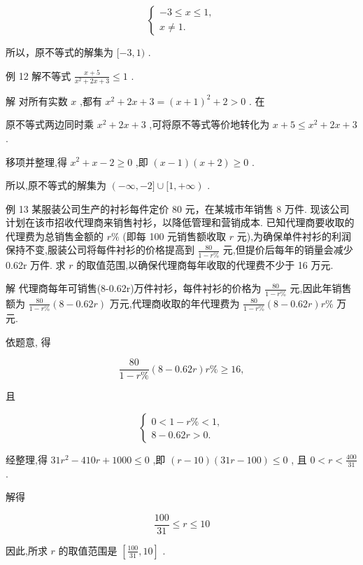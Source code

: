 \documentclass[10pt]{article}
\begin{document}
\[
\left\{  \begin{array}{l}  - 3 \leq  x \leq  1, \\  x \neq  1. \end{array}\right.
\]

所以，原不等式的解集为 \(\lbrack  - 3,1)\) .

例 12 解不等式 \(\frac{x + 5}{{x}^{2} + {2x} + 3} \leq  1\) .

解 对所有实数 \(x\) ,都有 \({x}^{2} + {2x} + 3 = {\left( x + 1\right) }^{2} + 2 > 0\) . 在

原不等式两边同时乘 \({x}^{2} + {2x} + 3\) ,可将原不等式等价地转化为 \(x + 5 \leq  {x}^{2} + {2x} + 3\) .

移项并整理,得 \({x}^{2} + x - 2 \geq  0\) ,即 \(\left( {x - 1}\right) \left( {x + 2}\right)  \geq  0\) .

所以,原不等式的解集为 \(\left( {-\infty , - 2\rbrack \cup \lbrack 1, + \infty }\right)\) .

例 13 某服装公司生产的衬衫每件定价 80 元，在某城市年销售 8 万件. 现该公司计划在该市招收代理商来销售衬衫，以降低管理和营销成本. 已知代理商要收取的代理费为总销售金额的 \(r\%\) (即每 100 元销售额收取 \(r\) 元),为确保单件衬衫的利润保持不变,服装公司将每件衬衫的价格提高到 \(\frac{80}{1 - r\% }\) 元,但提价后每年的销量会减少 0.62r 万件. 求 \(r\) 的取值范围,以确保代理商每年收取的代理费不少于 16 万元.

解 代理商每年可销售(8-0.62r)万件衬衫，每件衬衫的价格为 \(\frac{80}{1 - r\% }\) 元,因此年销售额为 \(\frac{80}{1 - r\% }\left( {8 - {0.62r}}\right)\) 万元,代理商收取的年代理费为 \(\frac{80}{1 - r\% }\left( {8 - {0.62r}}\right) r\%\) 万元.

依题意, 得

\[
\frac{80}{1 - r\% }\left( {8 - {0.62r}}\right) r\%  \geq  {16},
\]

且

\[
\left\{  \begin{array}{l} 0 < 1 - r\%  < 1, \\  8 - {0.62r} > 0. \end{array}\right.
\]

经整理,得 \({31}{r}^{2} - {410r} + {1000} \leq  0\) ,即 \(\left( {r - {10}}\right) \left( {{31r} - {100}}\right)  \leq  0\) , 且 \(0 < r < \frac{400}{31}\) .

解得

\[
\frac{100}{31} \leq  r \leq  {10}
\]

因此,所求 \(r\) 的取值范围是 \(\left\lbrack  {\frac{100}{31},{10}}\right\rbrack\) .
\end{document}
